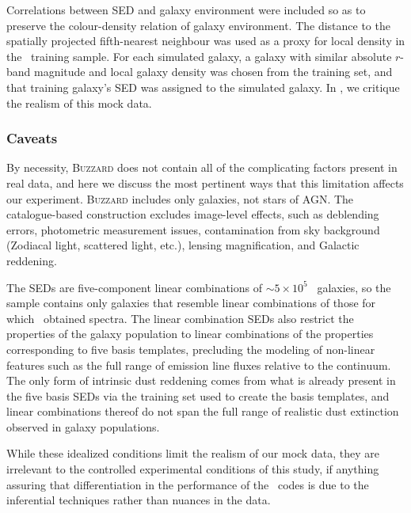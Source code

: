 Correlations between SED and galaxy environment were included so as to preserve the colour-density relation of galaxy environment.
The distance to the spatially projected fifth-nearest neighbour was used as a proxy for local density in the \sdss\ training sample.
For each simulated galaxy, a galaxy with similar absolute $r$-band magnitude and local galaxy density was chosen from the training set, and that training galaxy's SED was assigned to the simulated galaxy.
In , we critique the realism of this mock data.

\subsubsection{Caveats}

By necessity, \textsc{Buzzard} does not contain all of the complicating factors present in real data, and here we discuss the most pertinent ways that this limitation affects our experiment.
\textsc{Buzzard} includes only galaxies, not stars of AGN.
The catalogue-based construction excludes image-level effects, such as deblending errors, photometric measurement issues, contamination from sky background (Zodiacal light, scattered light, etc.), lensing magnification, and Galactic reddening.

The SEDs are five-component linear combinations of $\sim 5 \times 10^{5}$ \sdss\ galaxies, so the sample contains only galaxies that resemble linear combinations of those for which \sdss\ obtained spectra.
The linear combination SEDs also restrict the properties of the galaxy population to linear combinations of the properties corresponding to five basis templates, precluding the modeling of non-linear features such as the full range of emission line fluxes relative to the continuum.
The only form of intrinsic dust reddening comes from what is already present in the five basis SEDs via the training set used to create the basis templates, and linear combinations thereof do not span the full range of realistic dust extinction observed in galaxy populations.

While these idealized conditions limit the realism of our mock data, they are irrelevant to the controlled experimental conditions of this study, if anything assuring that differentiation in the performance of the \pzpdf\ codes is due to the inferential techniques rather than nuances in the data.

